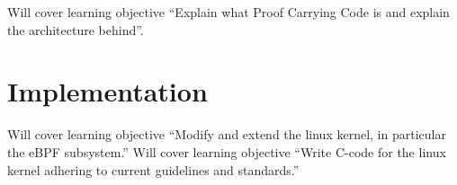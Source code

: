 Will cover learning objective ``Explain what Proof Carrying Code is and explain the architecture behind''.

\section{Implementation}
\label{sec:implementation}

Will cover learning objective ``Modify and extend the linux kernel, in particular the eBPF subsystem.''
Will cover learning objective ``Write C-code for the linux kernel adhering to current guidelines and standards.''













\appendix

